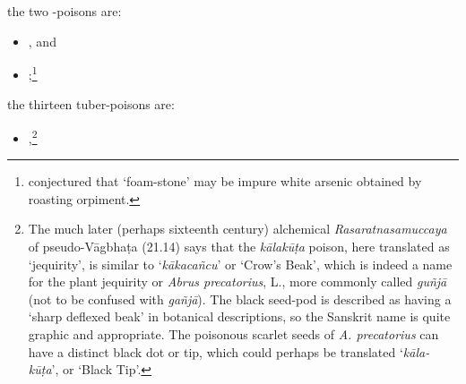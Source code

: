 \begin{translation}
        \item
        the two -poisons are:
              \begin{itemize}
            
        \item {}, and
        \item {};\footnote{\citet[38--42]{Dutt-1922} conjectured that
        `foam-stone' may be impure white arsenic obtained by roasting orpiment.}
            \end{itemize}
        \item
        the thirteen tuber-poisons are:
        \begin{itemize}
             \item {},\footnote{The much later (perhaps sixteenth century) alchemical
        \emph{Rasa\-ratna\-samuccaya} of pseudo-Vāgbhaṭa (21.14) says that the
        \emph{kāla\-kūṭa} poison, here translated as `jequirity', is similar to
        `\emph{kāka\-cañcu}' or `Crow's Beak', which is indeed a name for the
        plant jequirity or
        \emph{Abrus precatorius}, L., more commonly called \emph{guñjā} (not to
        be confused with \emph{gañjā}). The black seed-pod is described as
        having a `sharp deflexed beak' in botanical descriptions, so the
        Sanskrit name is quite graphic and appropriate. The poisonous scarlet
        seeds of \emph{A. precatorius} can have a distinct black dot or tip,
        which could perhaps be translated `\emph{kāla-kūṭa}', or `Black Tip'.
        
}
\end{itemize}
\end{translation}
